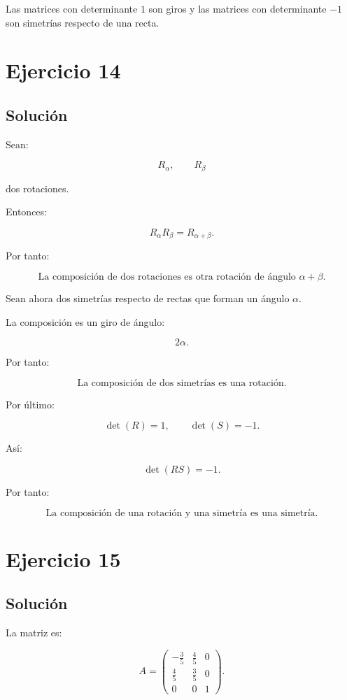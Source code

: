 \documentclass[11pt,a4paper]{article}
\begin{document}
Las matrices con determinante \(1\) son giros y las matrices con determinante \(-1\) son simetrías respecto de una recta.

\section{Ejercicio 14}
\subsection{Solución}

Sean:

\[
R_\alpha,
\qquad
R_\beta
\]

dos rotaciones.

Entonces:

\[
R_\alpha R_\beta
=
R_{\alpha+\beta}.
\]

Por tanto:

\[
\boxed{
\text{La composición de dos rotaciones es otra rotación de ángulo }\alpha+\beta.
}
\]

Sean ahora dos simetrías respecto de rectas que forman un ángulo \(\alpha\).

La composición es un giro de ángulo:

\[
2\alpha.
\]

Por tanto:

\[
\boxed{
\text{La composición de dos simetrías es una rotación.}
}
\]

Por último:

\[
\det(R)=1,
\qquad
\det(S)=-1.
\]

Así:

\[
\det(RS)=-1.
\]

Por tanto:

\[
\boxed{
\text{La composición de una rotación y una simetría es una simetría.}
}
\]

\section{Ejercicio 15}
\subsection{Solución}

La matriz es:

\[
A=
\begin{pmatrix}
-\frac35&\frac45&0\\[1mm]
\frac45&\frac35&0\\
0&0&1
\end{pmatrix}.
\]
\end{document}
